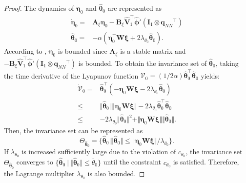 \documentclass[letterpaper, 10 pt, conference]{ieeeconf}  %
\newcommand*{\mv}[1]{\boldsymbol{#1}}
\newcommand*{\mm}[1]{\boldsymbol{#1}}
\begin{document}
\begin{proof}
The dynamics of ${\mm \eta}_0$ and ${\hat{\mv\theta}}_0$ are represented as
\begin{equation}
    \begin{aligned}     
        \dot{\mm \eta}_0 =& 
        \mm A_\xi{\mm \eta}_0 -\mm B_\xi 
        \hat {\mm V}_1^\top \hat{\mv\phi}'(\mm I_1\otimes {\mv q_{NN}}^\top )
        \\
        \dot{{\hat{\mv\theta}}}_0
        =&
        -\alpha 
        (
            {\mm \eta}_0^\top \mm W\mv \xi+2\lambda_{\theta_0} {\hat{\mv\theta}}_0
        )
        .
    \end{aligned}
\end{equation}
According to \cite[Chap.~4 T.~1.9]{RN32}, ${\mm \eta}_0$ is bounded since $\mm A_\xi$ is a stable matrix and $-\mm B_\xi\hat {\mm V}_1^\top \hat{\mv\phi}'(\mm I_1\otimes {\mv q_{NN}}^\top )$ is bounded.
To obtain the invariance set of ${\hat{\mv\theta}}_0$, taking the time derivative of the Lyapunov function $\mathcal V_0=(1/2\alpha){\hat{\mv\theta}}_0^\top {\hat{\mv\theta}}_0$ yields:
\begin{equation}
    \begin{aligned}
        \dot {\mathcal V}_0 =& 
        {\hat{\mv\theta}}_0^\top (-{\mm \eta}_0\mm W\mv \xi -2\lambda_{\theta_0}{\hat{\mv\theta}}_0)
        \\
        \le &
        \Vert{\hat{\mv\theta}}_0\Vert \Vert {\mm \eta}_0\mm W\mv \xi\Vert -2\lambda_{\theta_0} {\hat{\mv\theta}}_0^\top {\hat{\mv\theta}}_0
        \\
        \le &
        -2\lambda_{\theta_0} \Vert{\hat{\mv\theta}}_0\Vert^2 + \Vert {\mm \eta}_0\mm W\mv \xi\Vert \Vert {\hat{\mv\theta}}_0\Vert 
        .
    \end{aligned}
\end{equation}
Then, the invariance set can be represented as 
\begin{equation}
    \Theta_{{\hat{\mv\theta}}_0} =
    \{
        {\hat{\mv\theta}}_0\mid\Vert{\hat{\mv\theta}}_0\Vert 
        \le
        \Vert{\mm \eta}_0\mm W\mv \xi\Vert/\lambda_{\theta_0}
    \}
    .    
\end{equation}
If $\lambda_{\theta_0}$ is increased sufficiently large due to the violation of $c_{\theta_0}$, the invariance set $\Theta_{{\hat{\mv\theta}}_0}$ converges to $\{{\hat{\mv\theta}}_0\ \vert \ \Vert{\hat{\mv\theta}}_0\Vert \le \bar\theta_0\}$ until the constraint $c_{\theta_0}$ is satisfied.
Therefore, the Lagrange multiplier $\lambda_{\theta_0}$ is also bounded.

\end{proof}
\end{document}
